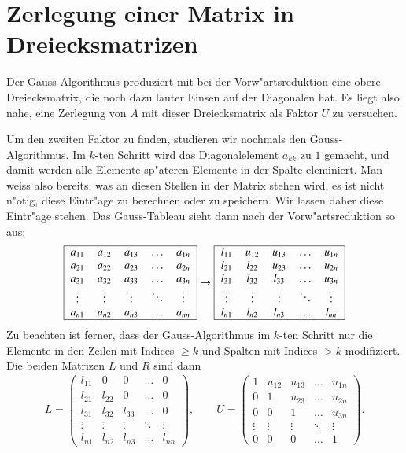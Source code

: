\section{Zerlegung einer Matrix in Dreiecksmatrizen}
Der Gauss-Algorithmus produziert mit bei der Vorw"artsreduktion eine
obere Dreiecksmatrix, die noch dazu lauter Einsen auf der Diagonalen
hat.
Es liegt also nahe, eine Zerlegung von $A$ mit dieser Dreiecksmatrix
als Faktor $U$ zu versuchen.

Um den zweiten Faktor zu finden, studieren wir nochmals den
Gauss-Algorithmus.
Im $k$-ten Schritt wird das Diagonalelement
$a_{kk}$ zu $1$ gemacht, und damit werden alle Elemente sp"ateren
Elemente in der Spalte eleminiert.
Man weiss also bereits, was an
diesen Stellen in der Matrix stehen wird, es ist nicht n"otig, diese
Eintr"age zu berechnen oder zu speichern.
Wir lassen daher diese
Eintr"age stehen.
Das Gauss-Tableau sieht dann nach der Vorw"artsreduktion
so aus:
\[
\begin{tabular}{|>{$}c<{$}>{$}c<{$}>{$}c<{$}>{$}c<{$}>{$}c<{$}|}
\hline
a_{11}&a_{12}&a_{13}&\dots &a_{1n}\\
a_{21}&a_{22}&a_{23}&\dots &a_{2n}\\
a_{31}&a_{32}&a_{33}&\dots &a_{3n}\\
\vdots&\vdots&\vdots&\ddots&\vdots\\
a_{n1}&a_{n2}&a_{n3}&\dots &a_{nn}\\
\hline
\end{tabular}
\rightarrow
\begin{tabular}{|>{$}c<{$}>{$}c<{$}>{$}c<{$}>{$}c<{$}>{$}c<{$}|}
\hline
l_{11}&u_{12}&u_{13}&\dots &u_{1n}\\
l_{21}&l_{22}&u_{23}&\dots &u_{2n}\\
l_{31}&l_{32}&l_{33}&\dots &u_{3n}\\
\vdots&\vdots&\vdots&\ddots&\vdots\\
l_{n1}&l_{n2}&l_{n3}&\dots &l_{nn}\\
\hline
\end{tabular}
\]
Zu beachten ist ferner, dass der Gauss-Algorithmus im $k$-ten Schritt nur 
die Elemente in den Zeilen mit Indices $\ge k$ und Spalten mit Indices $>k$ 
modifiziert.
Die beiden Matrizen $L$ und $R$ sind dann
\[
L=\begin{pmatrix}
l_{11}&0     &0     &\dots &0\\
l_{21}&l_{22}&0     &\dots &0\\
l_{31}&l_{32}&l_{33}&\dots &0\\
\vdots&\vdots&\vdots&\ddots&\vdots\\
l_{n1}&l_{n2}&l_{n3}&\dots &l_{nn}
\end{pmatrix},
\qquad
U=
\begin{pmatrix}
1     &u_{12}&u_{13}&\dots &u_{1n}\\
0     &1     &u_{23}&\dots &u_{2n}\\
0     &0     &1     &\dots &u_{3n}\\
\vdots&\vdots&\vdots&\ddots&\vdots\\
0     &0     &0     &\dots &1
\end{pmatrix}.
\]
